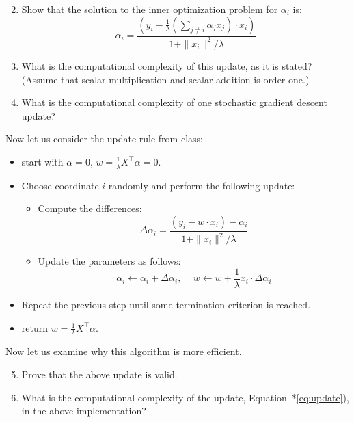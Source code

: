 \documentclass{article}
\begin{document}
\begin{enumerate}
\setcounter{enumi}{1} 
	\item Show that the solution to the inner optimization problem for $\alpha_i$ is:
	\[
	\alpha_i = \frac{ (y_i - \frac{1}{\lambda}(\sum_{j\neq i} \alpha_j x_j)\cdot x_i )}{1+\|x_i\|^2/\lambda} 
	\]
	\item What is the computational complexity of this update, as it is stated? (Assume that scalar multiplication and scalar addition is order one.)
	\item What is the computational complexity of one stochastic gradient descent update?
\end{enumerate}

Now let us consider the update rule from class:

\begin{itemize}
	\item start with $\alpha=0$, $w=\frac{1}{\lambda} X^\top \alpha=0$.
	\item Choose coordinate $i$ randomly and perform the following update:
	\begin{itemize}
		\item Compute the differences:
		\begin{equation}\label{eq:delta}
			\Delta \alpha_i =\frac{ (y_i -w\cdot x_i )-\alpha_i}{1+\|x_i\|^2/\lambda} 
		\end{equation}
		\item Update the parameters as follows:
		\begin{equation}\label{eq:update}
			\alpha_i \leftarrow \alpha_i+\Delta\alpha_i, \, \quad w \leftarrow w+\frac{1}{\lambda}x_i \cdot \Delta\alpha_i
		\end{equation}
	\end{itemize}
	\item Repeat the previous step until some termination criterion is reached.
	\item return $w =\frac{1}{\lambda} X^\top \alpha$.
\end{itemize}

Now let us examine why this algorithm is more efficient.

\begin{enumerate}
	\setcounter{enumi}{4} 
	\item Prove that the above update is valid.
	\item What is the computational complexity of the update, Equation~*\ref{eq:update}), in the above implementation?
\end{enumerate}
\end{document}

